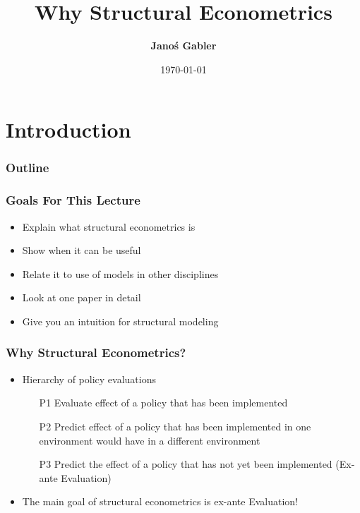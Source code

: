 \documentclass[11pt]{beamer}
\author[Janoś Gabler]
{
{\bf Janoś Gabler}}
\begin{document}
\title{Why Structural Econometrics}
\date{\today}

\begin{frame}
    \maketitle
    \note{~}
\end{frame}

\section{Introduction}

\begin{frame}\frametitle{Outline}
  \hspace{1cm}\begin{minipage}{\textwidth}
    \tableofcontents[hideallsubsections]
  \end{minipage}
\end{frame}


\begin{frame}[c]\frametitle{Goals For This Lecture}
    \begin{itemize}
        \item Explain what structural econometrics is
        \item Show when it can be useful
        \item Relate it to use of models in other disciplines
        \item Look at one paper in detail
        \item Give you an intuition for structural modeling
    \end{itemize}
\end{frame}



\begin{frame}[c]\frametitle{Why Structural Econometrics?}
    \begin{itemize}
        \item Hierarchy of policy evaluations
        \begin{enumerate}
            \item[P1] Evaluate effect of a policy that has been implemented
            \item[P2] Predict effect of a policy that has been implemented in one environment would have in a different environment
            \item[P3] Predict the effect of a policy that has not yet been implemented (Ex-ante Evaluation)
        \end{enumerate}
        \item The main goal of structural econometrics is ex-ante Evaluation!
    \end{itemize}
\end{frame}
\end{document}
